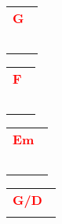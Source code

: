 \documentclass[12pt,a4paper,openany,UTF8]{memoir}
\begin{document}
\begin{tabular}[b]{l}
    \textbf{\textcolor{red}{G\ }}\\~\mbox{}\end{tabular}\begin{tabular}[b]{l}
    \textbf{\textcolor{red}{F\ }}\\~\mbox{}\end{tabular}\begin{tabular}[b]{l}
    \textbf{\textcolor{red}{Em\ }}\\~\mbox{}\end{tabular}\begin{tabular}[b]{l}
    \textbf{\textcolor{red}{G/D\ }}\\\mbox{}\end{tabular}

    \vspace{\parskip}
\end{document}
